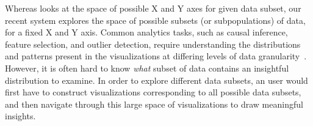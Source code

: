 \smallskip
{}
Whereas \seedb looks at the space of possible X and Y axes
for given data subset, 
our recent system \sbd explores 
the space of possible subsets 
(or subpopulations) of data,
for a fixed X and Y axis.
Common analytics tasks, 
such as causal inference, 
feature selection, and outlier detection, 
require understanding the distributions and 
patterns present in the visualizations 
at differing levels of data granularity~\cite{Anand2015,Heer2012,Wu2013}. 
However, it is often hard to know \textit{what} 
subset of data contains an 
insightful distribution to examine. 
In order to explore different data subsets, 
an user would first have to 
construct visualizations 
corresponding to all possible data subsets, 
and then navigate through this large space of 
visualizations to draw meaningful insights. 

